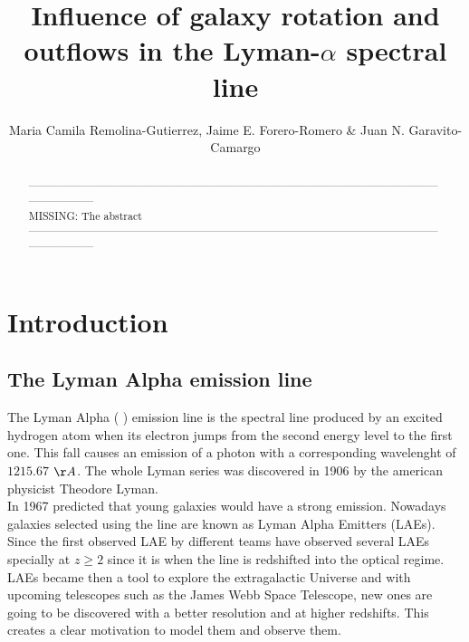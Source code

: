 \documentclass{latex/emulateapj}
\begin{document}
\title{Influence of galaxy rotation and outflows in the Lyman-$\alpha$ spectral line}


\author{Maria Camila Remolina-Gutierrez, Jaime E. Forero-Romero \& Juan N. Garavito-Camargo} 


\begin{abstract}
\noindent ------------------------------------------------------------------------------------------------------------------------------------\\
MISSING: The abstract\\
------------------------------------------------------------------------------------------------------------------------------------\\
\end{abstract}

\section{Introduction}
\label{sec:intro}


\subsection{The Lyman Alpha emission line}

The Lyman Alpha ( \lya) emission line is the spectral line produced by an excited hydrogen atom when its electron jumps from the second energy level to the first one. This fall causes an emission of a photon with a corresponding wavelenght of $1215.67$ $\AA$. The whole Lyman series was discovered in 1906 by the american physicist Theodore Lyman. \\


In 1967 \cite{PartridgePeebles} predicted that young galaxies would have a strong \lya  emission. Nowadays galaxies selected using the \lya line are known as Lyman Alpha Emitters (LAEs). Since the first observed LAE by \cite{DjorgovskiThompson} different teams have observed several LAEs \citep{Rhoads00,Gawiser2007,Koehler2007,Ouchi08,Yamada2012,Schenker2012,Kulas12, Yamada2012, Chonis2013,Finkelstein2013,Ostlin14,Hayes2014,Faisst2014, Fumagalli2015} specially at $z\geq2$ since it is when the  line is redshifted into the optical regime. LAEs became then a tool to explore the extragalactic Universe and with upcoming telescopes such as the James Webb Space Telescope, new ones are going to be discovered with a better resolution and at higher redshifts. This creates a clear motivation to model them and observe them. \\
\end{document}
